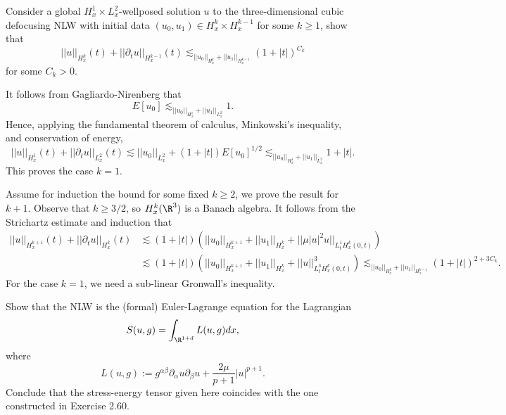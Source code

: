 \begin{statement}
	Consider a global $H^1_x \times L^2_x$-wellposed solution $u$ to the three-dimensional cubic defocusing NLW with initial data $(u_0, u_1) \in H^k_x \times H^{k - 1}_x$ for some $k \geq 1$, show that 
		\[ ||u||_{H^k_x} (t) + ||\partial_t u||_{H^{k - 1}_x} (t) \lesssim_{||u_0||_{H^k_x} + ||u_1||_{H^{k - 1}_x}} (1 + |t|)^{C_k} \]
	for some $C_k > 0$. 
\end{statement}

\begin{solution}
	It follows from Gagliardo-Nirenberg that
		\[ E[u_0] \lesssim_{||u_0||_{H^1_x} + ||u_1||_{L^2_x}} 1. \]
	Hence, applying the fundamental theorem of calculus, Minkowski's inequality, and conservation of energy,
		\[ ||u||_{H^1_x} (t) + ||\partial_t u||_{L^2_x} (t) \lesssim ||u_0||_{L^2_x} + (1 + |t|) E[u_0]^{1/2} \lesssim_{||u_0||_{H^1_x} + ||u_1||_{L^2_x}} 1 + |t|. \]
	This proves the case $k = 1$. 	
		
	Assume for induction the bound for some fixed $k \geq 2$, we prove the result for $k + 1$. Observe that $k \geq 3/2$, so $H^{k}_x (\R^3)$ is a Banach algebra. It follows from the Strichartz estimate and induction that 
		\begin{align*}
			  ||u||_{H^{k + 1}_x} (t) + ||\partial_t u||_{H^{k}_x} (t) 
			  	&\lesssim (1 + |t|) \left(||u_0||_{H^{k + 1}_x} + ||u_1||_{H^{k}_x} + || \mu |u|^2 u||_{L^1_t H^{k}_x (0, t)} \right) \\
			  	&\lesssim (1 + |t|) \left(||u_0||_{H^{k + 1}_x} + ||u_1||_{H^{k}_x} +  ||  u||_{L^3_t H^{k}_x (0, t)}^3 \right) \lesssim_{||u_0||_{H^k_x} + ||u_1||_{H^{k - 1}_x}} (1 + |t|)^{2  + 3C_k}.
		\end{align*}	  
	For the case $k = 1$, we need a sub-linear Gronwall's inequality. 	
\end{solution}

\begin{statement}
	Show that the NLW is the (formal) Euler-Lagrange equation for the Lagrangian
		\[ S(u, g) = \int_{\R^{1 + d}} L(u, g) dx, \]
	where
		\[ L(u, g) := g^{\alpha \beta} \partial_\alpha u \partial_\beta u + \frac{2\mu}{p + 1} |u|^{p + 1}.  \]
	Conclude that the stress-energy tensor given here coincides with the one constructed in Exercise 2.60. 		
\end{statement}

\begin{solution}
	
\end{solution}

